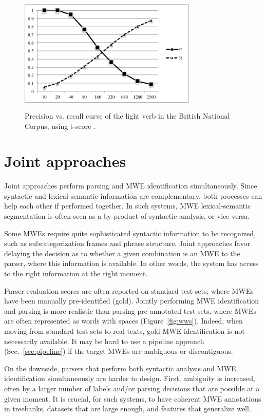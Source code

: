 \documentclass[output=paper]{LSP/langsci}
\begin{document}
\begin{figure}
\includegraphics[width=240pt,height=160pt]{figures/ICAME_2013_27_BW.pdf}
\caption{Precision vs. recall curve of the light verb  in the British National Corpus, using t-score \citep{ronan_schneider_mwe_15}.}
\label{discover-lightverbs}
\end{figure}


%
\section{Joint approaches}
\label{sec:joint}

Joint approaches perform parsing and MWE identification simultaneously.
Since syntactic and lexical-semantic information are complementary, both processes can help each other if performed together.
In such systems, MWE lexical-seman\-tic segmentation is often seen as a by-product of syntactic analysis, or vice-versa.

Some MWEs require quite sophisticated syntactic information to be recognized, such as subcategorization frames and phrase structure.
Joint approaches favor delaying the decision as to whether a given combination is an MWE to the parser, where this information is available.
In other words, the system has access to the right information at the right moment. %


Parser evaluation scores are often reported on standard test sets, where MWEs have been manually pre-identified (gold).
Jointly performing MWE identification and parsing is more realistic than parsing pre-annotated test sets, where MWEs are often represented as words with spaces (Figure~\ref{fig:wws}).
Indeed, when moving from standard test sets to real texts, gold MWE identification is not necessarily available.
It may be hard to use a pipeline approach (Sec.~\ref{sec:pipeline}) if the target MWEs are ambiguous or discontiguous.

On the downside, parsers that perform both syntactic analysis and MWE identification simultaneously are harder to design.
First, ambiguity is increased, often by a larger number of labels and/or parsing decisions that are possible at a given moment.
It is crucial, for such systems, to have coherent MWE annotations in treebanks, datasets that are large enough, and features that generalize well. 
\end{document}
